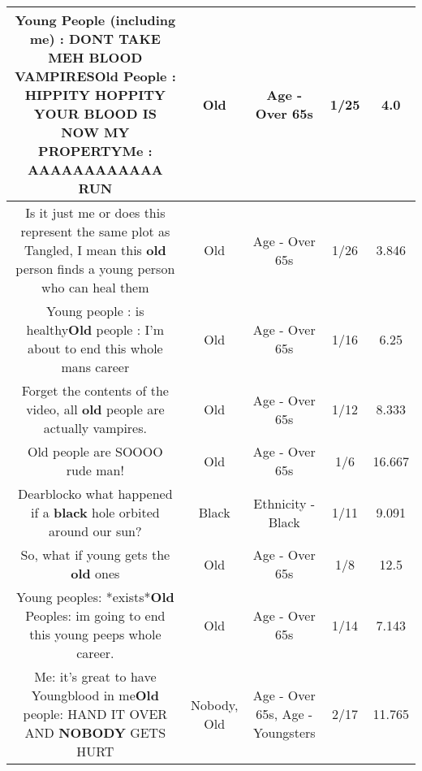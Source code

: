 \documentclass[11pt]{article}
\newlength\mylength
\begin{document}
\begin{center}
\begin{longtable}{|C{.65\mylength}|C{.30\mylength}|C{.12\mylength}|C{.12\mylength}|C{.12\mylength}|}
  \small Young People (including me) : DONT TAKE MEH BLOOD VAMPIRES\textbf{Old} People : HIPPITY HOPPITY YOUR BLOOD IS NOW MY PROPERTYMe : AAAAAAAAAAAA RUN\normalsize   & Old & Age - Over 65s & 1/25 & 4.0 \\  \hline
  \small Is it just me or does this represent the same plot as Tangled, I mean this \textbf{old} person finds a young person who can heal them\normalsize   & Old & Age - Over 65s & 1/26 & 3.846 \\  \hline
  \small Young people : is healthy\textbf{Old} people : I'm about to end this whole mans career\normalsize   & Old & Age - Over 65s & 1/16 & 6.25 \\  \hline
  \small Forget the contents of the video, all \textbf{old} people are actually vampires.\normalsize   & Old & Age - Over 65s & 1/12 & 8.333 \\  \hline
  \small Old people are SOOOO rude man!\normalsize   & Old & Age - Over 65s & 1/6 & 16.667 \\  \hline
  \small Dearblocko what happened if  a \textbf{black} hole orbited around our sun?\normalsize   & Black & Ethnicity - Black & 1/11 & 9.091 \\  \hline
  \small So, what if young gets the \textbf{old} ones\normalsize   & Old & Age - Over 65s & 1/8 & 12.5 \\  \hline
  \small Young peoples: *exists*\textbf{Old} Peoples: im going to end this young peeps whole career.\normalsize   & Old & Age - Over 65s & 1/14 & 7.143 \\  \hline
  \small Me: it's great to have Youngblood in me\textbf{Old} people: HAND IT OVER AND \textbf{NOBODY} GETS HURT\normalsize   & Nobody, Old & Age - Over 65s, Age - Youngsters & 2/17 & 11.765 \\  \hline

\end{longtable}
\end{center}
\end{document}
